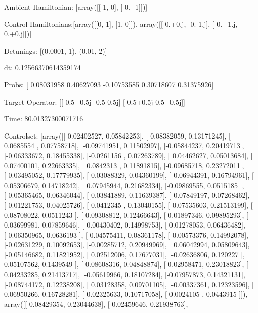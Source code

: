 \documentclass{article}
\begin{document}
    

\newpage

Ambient Hamiltonian: [array([[ 1,  0],
       [ 0, -1]])]

Control Hamiltonians:[array([[0, 1],
       [1, 0]]), array([[ 0.+0.j, -0.-1.j],
       [ 0.+1.j,  0.+0.j]])]

Detunings: [(0.0001, 1), (0.01, 2)]

 dt: 0.12566370614359174

Probs: [ 0.08031958  0.40627093 -0.10753585  0.30718607  0.31375926]

Target Operator: [[ 0.5+0.5j -0.5-0.5j]
 [ 0.5+0.5j  0.5+0.5j]]

Time: 80.01327300071716

Controlset: [array([[ 0.02402527,  0.05842253],
       [ 0.08382059,  0.13171245],
       [ 0.0685554 ,  0.07758718],
       [-0.09741951,  0.11502997],
       [-0.05844237,  0.20419713],
       [-0.06333672,  0.18455338],
       [-0.0261156 ,  0.07263789],
       [ 0.04462627,  0.05013684],
       [ 0.07400101,  0.22663335],
       [ 0.0842313 ,  0.11891815],
       [-0.09685718,  0.23272011],
       [-0.03495052,  0.17779935],
       [-0.03088329,  0.04360199],
       [ 0.06944391,  0.16794961],
       [ 0.05306679,  0.14718242],
       [ 0.07945944,  0.21682334],
       [-0.09869555,  0.0515185 ],
       [-0.05365465,  0.06346044],
       [ 0.03841889,  0.11639387],
       [ 0.07849197,  0.07268462],
       [-0.01221753,  0.04025726],
       [ 0.0412345 ,  0.13040155],
       [-0.07535603,  0.21513199],
       [ 0.08708022,  0.0511243 ],
       [-0.09308812,  0.12466643],
       [ 0.01897346,  0.09895293],
       [ 0.03699981,  0.07859646],
       [ 0.00430402,  0.14998753],
       [-0.01278053,  0.06436482],
       [-0.06350965,  0.0636193 ],
       [-0.04575411,  0.08361178],
       [-0.00573376,  0.14992078],
       [-0.02631229,  0.10092653],
       [-0.00285712,  0.20949969],
       [ 0.06042994,  0.05809643],
       [-0.05146682,  0.11821952],
       [ 0.02512006,  0.17677031],
       [-0.02636806,  0.120227  ],
       [ 0.05107562,  0.1439549 ],
       [ 0.08608316,  0.04848874],
       [-0.02958471,  0.23018823],
       [ 0.04233285,  0.21413717],
       [-0.05619966,  0.18107284],
       [-0.07957873,  0.14321131],
       [-0.08744172,  0.12238208],
       [ 0.03128358,  0.09701105],
       [-0.00337361,  0.12323596],
       [ 0.06950266,  0.16728281],
       [ 0.02325633,  0.10717058],
       [-0.0024105 ,  0.0443915 ]]), array([[ 0.08429354,  0.23044638],
       [-0.02459646,  0.21938763],
\end{document}
